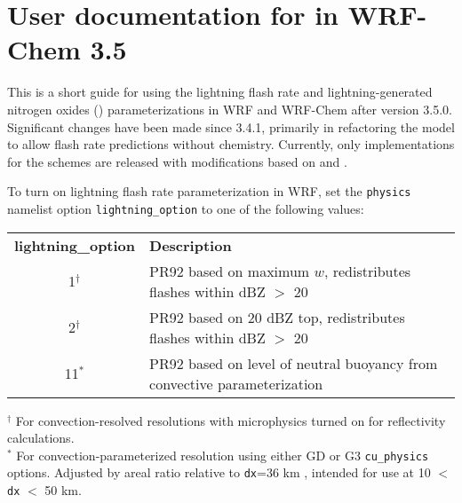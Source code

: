 \chapter{User documentation for  in WRF-Chem 3.5} \label{apdx:lnox-doc}

\ifpdf
    \graphicspath{{Appendix/figures/PNG/}{Appendix/figures/PDF/}{Appendix/figures/}}
\else
    \graphicspath{{Appendix/figures/EPS/}{Appendix/figures/}}
\fi

This is a short guide for using the lightning flash rate and lightning-generated nitrogen oxides () parameterizations in WRF and WRF-Chem after version 3.5.0. Significant changes have been made since 3.4.1, primarily in refactoring the model to allow flash rate predictions without chemistry. Currently, only implementations for the  \citet[][hereafter PR92]{Price:1992wb} schemes are released with modifications based on \citet{Barth:2012qf} and \citet{Wong:2012fk}.

To turn on lightning flash rate parameterization in WRF, set the {\tt physics} namelist option {\tt lightning\_option} to one of the following values:
\begin{center}
\begin{tabular}{cp{4.5in}}
	{\bf lightning\_option} & {\bf Description} \\
	1$^\dagger$ & PR92 based on maximum $w$, redistributes flashes within dBZ $>$ 20 \\
	2$^\dagger$ & PR92 based on 20 dBZ top, redistributes flashes within dBZ $>$ 20  \\
	11$^*$ & PR92 based on level of neutral buoyancy from convective parameterization
\end{tabular} 
\end{center}
{\footnotesize
	$^\dagger$ For convection-resolved resolutions with microphysics turned on for reflectivity calculations. \\
	$^*$ For convection-parameterized resolution using either GD or G3 {\tt cu\_physics} options. Adjusted by areal ratio relative to {\tt dx}=36 km \citep{Wong:2012fk}, intended for use at 10 $<$ {\tt dx} $<$ 50 km.
}
\vspace{.4in}

